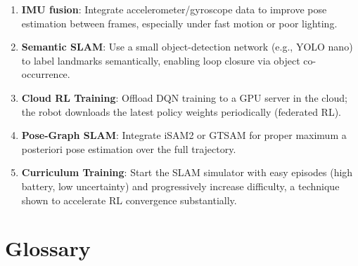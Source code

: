 \documentclass[12pt,a4paper,twoside]{report}
\theoremstyle{definition}
\begin{document}
\begin{enumerate}
  \item \textbf{IMU fusion}: Integrate accelerometer/gyroscope data to improve
        pose estimation between frames, especially under fast motion or poor
        lighting.

  \item \textbf{Semantic SLAM}: Use a small object-detection network (e.g., YOLO
        nano) to label landmarks semantically, enabling loop closure via
        object co-occurrence.

  \item \textbf{Cloud RL Training}: Offload DQN training to a GPU server in
        the cloud; the robot downloads the latest policy weights periodically
        (federated RL).

  \item \textbf{Pose-Graph SLAM}: Integrate iSAM2 or GTSAM for proper maximum a
        posteriori pose estimation over the full trajectory.

  \item \textbf{Curriculum Training}: Start the SLAM simulator with easy episodes
        (high battery, low uncertainty) and progressively increase difficulty,
        a technique shown to accelerate RL convergence substantially.
\end{enumerate}

\chapter{Glossary}
\end{document}
